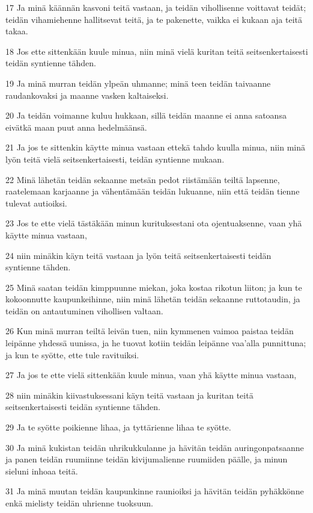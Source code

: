 \par 17 Ja minä käännän kasvoni teitä vastaan, ja teidän vihollisenne voittavat teidät; teidän vihamiehenne hallitsevat teitä, ja te pakenette, vaikka ei kukaan aja teitä takaa.
\par 18 Jos ette sittenkään kuule minua, niin minä vielä kuritan teitä seitsenkertaisesti teidän syntienne tähden.
\par 19 Ja minä murran teidän ylpeän uhmanne; minä teen teidän taivaanne raudankovaksi ja maanne vasken kaltaiseksi.
\par 20 Ja teidän voimanne kuluu hukkaan, sillä teidän maanne ei anna satoansa eivätkä maan puut anna hedelmäänsä.
\par 21 Ja jos te sittenkin käytte minua vastaan ettekä tahdo kuulla minua, niin minä lyön teitä vielä seitsenkertaisesti, teidän syntienne mukaan.
\par 22 Minä lähetän teidän sekaanne metsän pedot riistämään teiltä lapsenne, raatelemaan karjaanne ja vähentämään teidän lukuanne, niin että teidän tienne tulevat autioiksi.
\par 23 Jos te ette vielä tästäkään minun kurituksestani ota ojentuaksenne, vaan yhä käytte minua vastaan,
\par 24 niin minäkin käyn teitä vastaan ja lyön teitä seitsenkertaisesti teidän syntienne tähden.
\par 25 Minä saatan teidän kimppuunne miekan, joka kostaa rikotun liiton; ja kun te kokoonnutte kaupunkeihinne, niin minä lähetän teidän sekaanne ruttotaudin, ja teidän on antautuminen vihollisen valtaan.
\par 26 Kun minä murran teiltä leivän tuen, niin kymmenen vaimoa paistaa teidän leipänne yhdessä uunissa, ja he tuovat kotiin teidän leipänne vaa'alla punnittuna; ja kun te syötte, ette tule ravituiksi.
\par 27 Ja jos te ette vielä sittenkään kuule minua, vaan yhä käytte minua vastaan,
\par 28 niin minäkin kiivastuksessani käyn teitä vastaan ja kuritan teitä seitsenkertaisesti teidän syntienne tähden.
\par 29 Ja te syötte poikienne lihaa, ja tyttärienne lihaa te syötte.
\par 30 Ja minä kukistan teidän uhrikukkulanne ja hävitän teidän auringonpatsaanne ja panen teidän ruumiinne teidän kivijumalienne ruumiiden päälle, ja minun sieluni inhoaa teitä.
\par 31 Ja minä muutan teidän kaupunkinne raunioiksi ja hävitän teidän pyhäkkönne enkä mielisty teidän uhrienne tuoksuun.
